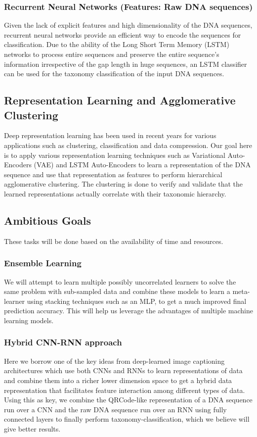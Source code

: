 \documentclass[12pt]{article}
\begin{document}
        \subsubsection{Recurrent Neural Networks (Features: Raw DNA sequences)}
        Given the lack of explicit features and high dimensionality of the DNA sequences, recurrent neural networks provide an efficient way to encode the sequences for classification. Due to the ability of the Long Short Term Memory (LSTM) networks to process entire sequences and preserve the entire sequence's information irrespective of the gap length in huge sequences, an LSTM classifier can be used for the taxonomy classification of the input DNA sequences.

    \subsection{Representation Learning and Agglomerative Clustering}
    Deep representation learning has been used in recent years for various applications such as clustering, classification and data compression. Our goal here is to apply various representation learning techniques such as Variational Auto-Encoders (VAE) and LSTM Auto-Encoders to learn a representation of the DNA sequence and use that representation as features to perform hierarchical agglomerative clustering. The clustering is done to verify and validate that the learned representations actually correlate with their taxonomic hierarchy.
    \subsection{Ambitious Goals}
        These tasks will be done based on the availability of time and resources.
        \subsubsection{Ensemble Learning}
        We will attempt to learn multiple possibly uncorrelated learners to solve the same problem with sub-sampled data and combine these models to learn a meta-learner using stacking techniques such as an MLP, to get a much improved final prediction accuracy. This will help us leverage the advantages of multiple machine learning models.
        \subsubsection{Hybrid CNN-RNN approach}
        Here we borrow one of the key ideas from deep-learned image captioning architectures which use both CNNs and RNNs to learn representations of data and combine them into a richer lower dimension space to get a hybrid data representation that facilitates feature interaction among different types of data. Using this as key, we combine the QRCode-like representation of a DNA sequence run over a CNN and the raw DNA sequence run over an RNN using fully connected layers to finally perform taxonomy-classification, which we believe will give better results.
\end{document}

